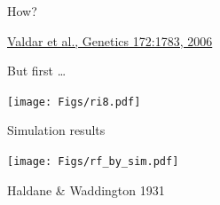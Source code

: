 \documentclass[12pt]{article}
\newcommand{\citesize}{\fontsize{14}{18} \selectfont}
\newcommand{\headsize}{\fontsize{35}{35} \selectfont}
\begin{document}
{\begin{minipage}[t]{45mm}
How?
\end{minipage}


\vfill

\hfill {\citesize \color{citecolor} \href{http://www.genetics.org/content/172/3/1783.full}{Valdar et al., Genetics 172:1783, 2006}}

\vspace*{5mm}


\newpage


\headsize \color{myyellow}
\hfill \begin{minipage}{5.75in}
\centering
But first \dots
\end{minipage}

\vfill

\centerline{\texttt{[image: Figs/ri8.pdf]}}


\newpage

\headsize \color{myyellow}
\hfill \begin{minipage}{5.75in}
\centering
Simulation results
\end{minipage}

\vfill

\centerline{\texttt{[image: Figs/rf\_by\_sim.pdf]}}

\vspace{15mm}

\newpage

\headsize \color{myyellow}
\hfill
\begin{minipage}{6.55in}
\centering
Haldane \& Waddington 1931
\end{minipage}

\vspace{25mm}

}
\end{document}
